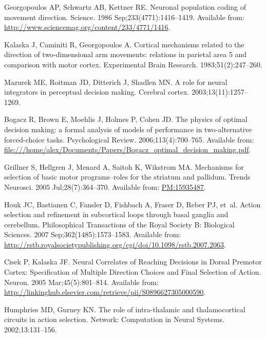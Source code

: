 \documentclass[10pt,letterpaper]{article}
\begin{document}
\begin{thebibliography}{10}
Georgopoulos AP, Schwartz AB, Kettner RE.
\newblock Neuronal population coding of movement direction.
\newblock Science. 1986 Sep;233(4771):1416--1419.
\newblock Available from:
  \url{http://www.sciencemag.org/content/233/4771/1416}.

Kalaska J, Caminiti R, Georgopoulos A.
\newblock Cortical mechanisms related to the direction of two-dimensional arm
  movements: relations in parietal area 5 and comparison with motor cortex.
\newblock Experimental Brain Research. 1983;51(2):247--260.

Mazurek ME, Roitman JD, Ditterich J, Shadlen MN.
\newblock A role for neural integrators in perceptual decision making.
\newblock Cerebral cortex. 2003;13(11):1257--1269.

Bogacz R, Brown E, Moehlis J, Holmes P, Cohen JD.
\newblock The physics of optimal decision making: a formal analysis of models
  of performance in two-alternative forced-choice tasks.
\newblock Psychological Review. 2006;113(4):700--765.
\newblock Available from:
  \url{file:///home/alex/Documents/Papers/Bogacz_optimal_decision_making.pdf}.

Grillner S, Hellgren J, Menard A, Saitoh K, Wikstrom MA.
\newblock Mechanisms for selection of basic motor programs–roles for the
  striatum and pallidum.
\newblock Trends Neurosci. 2005 Jul;28(7):364--370.
\newblock Available from: \url{PM:15935487}.

Houk JC, Bastianen C, Fansler D, Fishbach A, Fraser D, Reber PJ, et~al.
\newblock Action selection and refinement in subcortical loops through basal
  ganglia and cerebellum.
\newblock Philosophical Transactions of the Royal Society B: Biological
  Sciences. 2007 Sep;362(1485):1573--1583.
\newblock Available from:
  \url{http://rstb.royalsocietypublishing.org/cgi/doi/10.1098/rstb.2007.2063}.

Cisek P, Kalaska JF.
\newblock Neural {Correlates} of {Reaching} {Decisions} in {Dorsal} {Premotor}
  {Cortex}: {Specification} of {Multiple} {Direction} {Choices} and {Final}
  {Selection} of {Action}.
\newblock Neuron. 2005 Mar;45(5):801--814.
\newblock Available from:
  \url{http://linkinghub.elsevier.com/retrieve/pii/S0896627305000590}.

Humphries MD, Gurney KN.
\newblock The role of intra-thalamic and thalamocortical circuits in action
  selection.
\newblock Network: Computation in Neural Systems. 2002;13:131--156.


\end{thebibliography}
\end{document}
